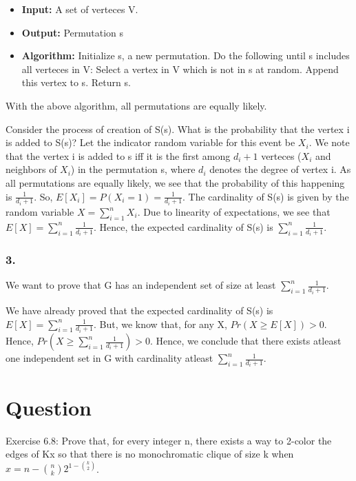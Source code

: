 \documentclass[10pt]{article}
\begin{document}
\begin{itemize}
\item \textbf{Input:} A set of verteces V.
\item \textbf{Output:} Permutation s
\item \textbf{Algorithm:}
\subitem Initialize s, a new permutation.
\subitem Do the following until s includes all verteces in V:
\subsubitem Select a vertex in V which is not in s at random.
\subsubitem Append this vertex to s.
\subitem Return s.
\end{itemize}

With the above algorithm, all permutations are equally likely.

Consider the process of creation of S(s). What is the probability that the vertex i is added to S(s)? Let the indicator random variable for this event be $X_{i}$. We note that the vertex i is added to s iff it is the first among $d_{i}+1$ verteces ($X_{i}$ and neighbors of $X_{i}$) in the permutation s, where $d_{i}$ denotes the degree of vertex i. As all permutations are equally likely, we see that the probability of this happening is $\frac{1}{d_{i}+1}$. So, $E[X_{i}]=P(X_{i}=1)=\frac{1}{d_{i}+1}$. The cardinality of S(s) is given by the random variable $X=\sum_{i=1}^{n}X_{i}$. Due to linearity of expectations, we see that $E[X]=\sum_{i=1}^{n}\frac{1}{d_{i}+1}$. Hence, the expected cardinality of S(s) is $\sum_{i=1}^{n}\frac{1}{d_{i}+1}$.

\subsubsection{3.} We want to prove that G has an independent set of size at least $\sum_{i=1}^{n}\frac{1}{d_{i}+1}$.

We have already proved that the expected cardinality of S(s) is $E[X]=\sum_{i=1}^{n}\frac{1}{d_{i}+1}$. But, we know that, for any X, $Pr(X\geq E[X])>0$. Hence, $Pr(X \geq \sum_{i=1}^{n}\frac{1}{d_{i}+1})>0$. Hence, we conclude that there exists atleast one independent set in G with cardinality atleast $\sum_{i=1}^{n}\frac{1}{d_{i}+1}$.

\section{Question}
Exercise 6.8: Prove that, for every integer n, there exists a way to 2-color the edges of Kx so that there is no monochromatic clique of size k when $x=n-\binom{n}{k}2^{1-\binom{k}{2}}$.
\end{document}
